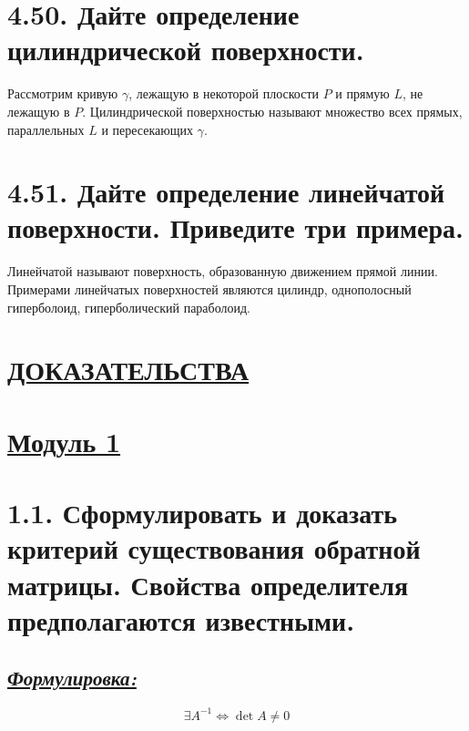 \documentclass{article}
\begin{document}
\section*{\LARGE 4.50. Дайте определение цилиндрической поверхности.}
Рассмотрим кривую $\gamma$, лежащую в некоторой плоскости $P$ и прямую $L$, не лежащую в $P$.
\newline Цилиндрической поверхностью называют множество всех прямых, параллельных $L$ и пересекающих $\gamma$.

\section*{\LARGE 4.51. Дайте определение линейчатой поверхности. Приведите три примера.}
Линейчатой называют поверхность, образованную движением прямой линии. Примерами линейчатых поверхностей являются цилиндр, однополосный гиперболоид, гиперболический параболоид.

\newpage
{}
\section*{\LARGE\centering \underline{ДОКАЗАТЕЛЬСТВА}}

\section*{\LARGE\centering \underline{Модуль 1}}

\section*{\LARGE 1.1. Сформулировать и доказать критерий существования обратной матрицы. Свойства определителя предполагаются известными.}
\subsection*{\Large \underline{\textit{Формулировка: }}}
$$\exists A^{-1} \Leftrightarrow \det{A} \ne 0$$ 
\end{document}
